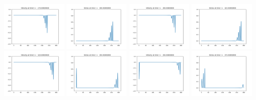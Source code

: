 \documentclass[11pt]{article}
\begin{document}
\includegraphics[width=0.2375\textwidth]{frame0011fig2.png}
\vskip 10pt 
\includegraphics[width=0.2375\textwidth]{frame0012fig1.png}
\includegraphics[width=0.2375\textwidth]{frame0012fig2.png}
\includegraphics[width=0.2375\textwidth]{frame0013fig1.png}
\includegraphics[width=0.2375\textwidth]{frame0013fig2.png}
\vskip 10pt 
\includegraphics[width=0.2375\textwidth]{frame0014fig1.png}
\includegraphics[width=0.2375\textwidth]{frame0014fig2.png}
\includegraphics[width=0.2375\textwidth]{frame0015fig1.png}
\end{document}
